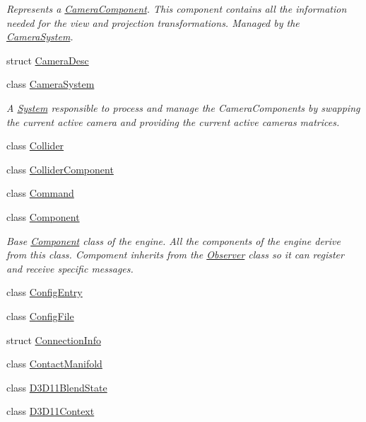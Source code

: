 \begin{DoxyCompactItemize}
\begin{DoxyCompactList}\small\item\em Represents a \hyperlink{class_blade_1_1_camera_component}{Camera\+Component}. This component contains all the information needed for the view and projection transformations. Managed by the \hyperlink{class_blade_1_1_camera_system}{Camera\+System}. \end{DoxyCompactList}\item 
struct \hyperlink{struct_blade_1_1_camera_desc}{Camera\+Desc}
\item 
class \hyperlink{class_blade_1_1_camera_system}{Camera\+System}
\begin{DoxyCompactList}\small\item\em A \hyperlink{class_blade_1_1_system}{System} responsible to process and manage the Camera\+Components by swapping the current active camera and providing the current active camera\textquotesingle{}s matrices. \end{DoxyCompactList}\item 
class \hyperlink{class_blade_1_1_collider}{Collider}
\item 
class \hyperlink{class_blade_1_1_collider_component}{Collider\+Component}
\item 
class \hyperlink{class_blade_1_1_command}{Command}
\item 
class \hyperlink{class_blade_1_1_component}{Component}
\begin{DoxyCompactList}\small\item\em Base \hyperlink{class_blade_1_1_component}{Component} class of the engine. All the components of the engine derive from this class. Compoment inherits from the \hyperlink{class_blade_1_1_observer}{Observer} class so it can register and receive specific messages. \end{DoxyCompactList}\item 
class \hyperlink{class_blade_1_1_config_entry}{Config\+Entry}
\item 
class \hyperlink{class_blade_1_1_config_file}{Config\+File}
\item 
struct \hyperlink{struct_blade_1_1_connection_info}{Connection\+Info}
\item 
class \hyperlink{class_blade_1_1_contact_manifold}{Contact\+Manifold}
\item 
class \hyperlink{class_blade_1_1_d3_d11_blend_state}{D3\+D11\+Blend\+State}
\item 
class \hyperlink{class_blade_1_1_d3_d11_context}{D3\+D11\+Context}
\item 

\end{DoxyCompactItemize}
